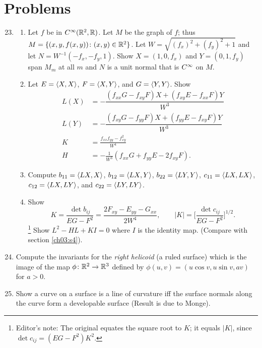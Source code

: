 \documentclass[../main]{subfiles}
\begin{document}
\section*{Problems}

\begin{enumerate}
    \setcounter{enumi}{22}
    \item\label{pro:23} 
    \begin{enumerate}[label = (\roman*)]
        \item Let $f$ be in $C^\infty(\mathbb{R}^2, \mathbb{R})$. Let $M$ be the graph of $f$; thus \\ $M = \{(x,y,f(x,y)) \colon (x,y) \in \mathbb{R}^2\}$. Let $W = \sqrt{(f_x)^2 + (f_y)^2 + 1}$ and let $N = W^{-1}(-f_x, -f_y, 1)$. Show $X = (1, 0, f_x)$ and $Y = (0, 1, f_y)$ span $M_m$ at all $m$ and $N$ is a unit normal that is $C^\infty$ on $M$.
        \item Let $E = \left\langle X,X\right\rangle$, $F=\left\langle X,Y\right\rangle$, and $G = \left\langle Y,Y\right\rangle$. Show
    \[ 
    \begin{aligned}
    L(X) &= -\dfrac{(f_{xx}G-f_{xy}F)X + (f_{xy}E - f_{xx}F)Y}{W^3}\\
    L(Y) &= -\dfrac{(f_{xy}G-f_{yy}F)X+(f_{yy}E-f_{xy}F)Y}{W^3}\\
    K &= \frac{f_{xx}f_{yy} - f_{xy}^2}{W^4}\\
    H &= -\frac{1}{W^3} (f_{xx}G + f_{yy}E - 2f_{xy}F).
    \end{aligned}
    \]
        \item Compute $b_{11} = \left\langle LX,X\right\rangle$, $b_{12}=\left\langle LX,Y\right\rangle$, $b_{22} = \left\langle LY,Y\right\rangle$, $c_{11}=\left\langle LX,LX\right\rangle$, $c_{12}=\left\langle LX,LY\right\rangle$, and $c_{22}=\left\langle LY,LY\right\rangle$.
        \item Show \[K = \dfrac{\det b_{ij}}{EG-F^2} = \dfrac{2F_{xy} -E_{yy} - G_{xx}}{2W^4}, \qquad |K| = \bigg[\dfrac{\det c_{ij}}{EG-F^2}\bigg]^{1/2}.\]\footnote{Editor's note: The original equates the square root to $K$; it equals $|K|$, since $\det c_{ij}=(EG-F^2)K^2$.} Show $L^2 - HL + KI = 0$ where $I$ is the identity map. (Compare with section \ref{ch03:s4}).
    \end{enumerate}
     
    
    
    
    \item\label{pro:24} Compute the invariants for the \emph{right helicoid} (a ruled surface) which is the image of the map $\phi\colon\mathbb{R}^2\to\mathbb{R}^3$ defined by $\phi(u,v) = (u\cos v,u\sin v, av)$ for $a>0$. 
    
    \item\label{pro:25} Show a curve on a surface is a line of curvature iff the surface normals along the curve form a developable surface (Result is due to Monge).
\end{enumerate}
\end{document}
